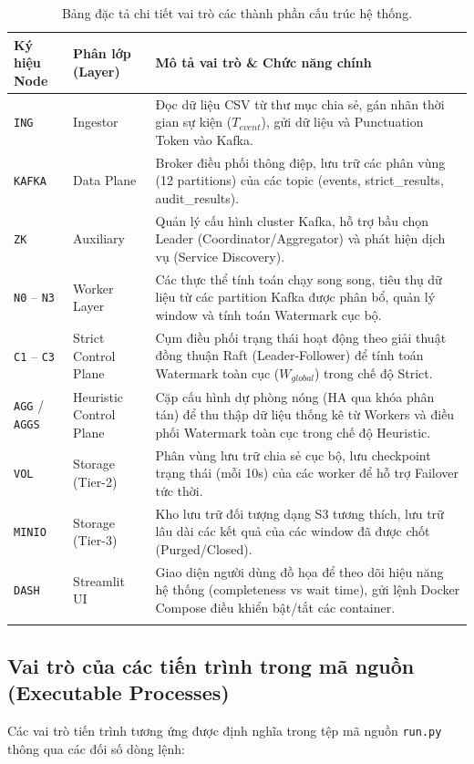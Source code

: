 \documentclass[12pt,a4paper]{article}
\begin{document}
\begin{longtable}{p{} p{} p{}}
\toprule
\textbf{Ký hiệu Node} & \textbf{Phân lớp (Layer)} & \textbf{Mô tả vai trò \& Chức năng chính} \\
\midrule
\endhead
\texttt{ING} & Ingestor & Đọc dữ liệu CSV từ thư mục chia sẻ, gán nhãn thời gian sự kiện ($T_{event}$), gửi dữ liệu và Punctuation Token vào Kafka. \\
\texttt{KAFKA} & Data Plane & Broker điều phối thông điệp, lưu trữ các phân vùng (12 partitions) của các topic (events, strict\_results, audit\_results). \\
\texttt{ZK} & Auxiliary & Quản lý cấu hình cluster Kafka, hỗ trợ bầu chọn Leader (Coordinator/Aggregator) và phát hiện dịch vụ (Service Discovery). \\
\texttt{N0} -- \texttt{N3} & Worker Layer & Các thực thể tính toán chạy song song, tiêu thụ dữ liệu từ các partition Kafka được phân bổ, quản lý window và tính toán Watermark cục bộ. \\
\texttt{C1} -- \texttt{C3} & Strict Control Plane & Cụm điều phối trạng thái hoạt động theo giải thuật đồng thuận Raft (Leader-Follower) để tính toán Watermark toàn cục ($W_{global}$) trong chế độ Strict. \\
\texttt{AGG} / \texttt{AGGS} & Heuristic Control Plane & Cặp cấu hình dự phòng nóng (HA qua khóa phân tán) để thu thập dữ liệu thống kê từ Workers và điều phối Watermark toàn cục trong chế độ Heuristic. \\
\texttt{VOL} & Storage (Tier-2) & Phân vùng lưu trữ chia sẻ cục bộ, lưu checkpoint trạng thái (mỗi 10s) của các worker để hỗ trợ Failover tức thời. \\
\texttt{MINIO} & Storage (Tier-3) & Kho lưu trữ đối tượng dạng S3 tương thích, lưu trữ lâu dài các kết quả của các window đã được chốt (Purged/Closed). \\
\texttt{DASH} & Streamlit UI & Giao diện người dùng đồ họa để theo dõi hiệu năng hệ thống (completeness vs wait time), gửi lệnh Docker Compose điều khiển bật/tắt các container. \\
\bottomrule
\caption{Bảng đặc tả chi tiết vai trò các thành phần cấu trúc hệ thống.}
\end{longtable}

\subsection{Vai trò của các tiến trình trong mã nguồn (Executable Processes)}
Các vai trò tiến trình tương ứng được định nghĩa trong tệp mã nguồn \texttt{run.py} thông qua các đối số dòng lệnh:
\end{document}
